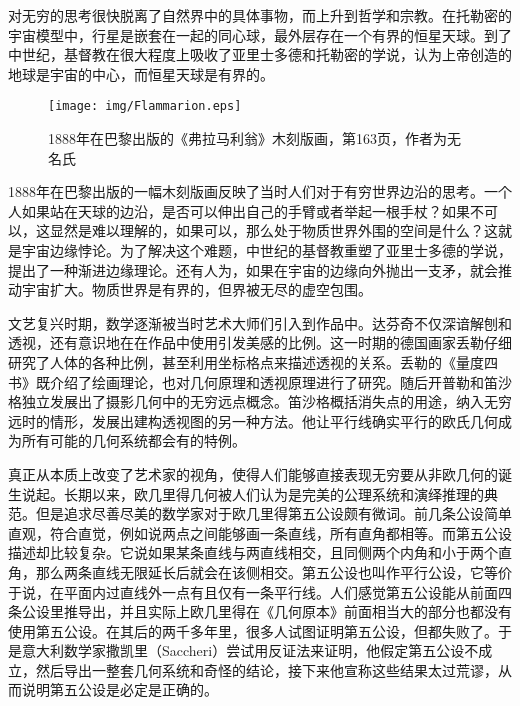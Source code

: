 \documentclass{article}
\begin{document}
对无穷的思考很快脱离了自然界中的具体事物，而上升到哲学和宗教。在托勒密的宇宙模型中，行星是嵌套在一起的同心球，最外层存在一个有界的恒星天球。到了中世纪，基督教在很大程度上吸收了亚里士多德和托勒密的学说，认为上帝创造的地球是宇宙的中心，而恒星天球是有界的。

\begin{figure}[htbp]
 \centering
 \texttt{[image: img/Flammarion.eps]}
 \captionsetup{labelformat=empty}
 \caption{1888年在巴黎出版的《弗拉马利翁》木刻版画，第163页，作者为无名氏}
 \label{fig:Flamarion-woodcut}
\end{figure}




1888年在巴黎出版的一幅木刻版画反映了当时人们对于有穷世界边沿的思考。一个人如果站在天球的边沿，是否可以伸出自己的手臂或者举起一根手杖？如果不可以，这显然是难以理解的，如果可以，那么处于物质世界外围的空间是什么？这就是宇宙边缘悖论。为了解决这个难题，中世纪的基督教重塑了亚里士多德的学说，提出了一种渐进边缘理论。还有人为，如果在宇宙的边缘向外抛出一支矛，就会推动宇宙扩大。物质世界是有界的，但界被无尽的虚空包围。

文艺复兴时期，数学逐渐被当时艺术大师们引入到作品中。达芬奇不仅深谙解刨和透视，还有意识地在在作品中使用引发美感的比例。这一时期的德国画家丢勒仔细研究了人体的各种比例，甚至利用坐标格点来描述透视的关系。丢勒的《量度四书》既介绍了绘画理论，也对几何原理和透视原理进行了研究。随后开普勒和笛沙格独立发展出了摄影几何中的无穷远点概念。笛沙格概括消失点的用途，纳入无穷远时的情形，发展出建构透视图的另一种方法。他让平行线确实平行的欧氏几何成为所有可能的几何系统都会有的特例。

真正从本质上改变了艺术家的视角，使得人们能够直接表现无穷要从非欧几何的诞生说起。长期以来，欧几里得几何被人们认为是完美的公理系统和演绎推理的典范。但是追求尽善尽美的数学家对于欧几里得第五公设颇有微词。前几条公设简单直观，符合直觉，例如说两点之间能够画一条直线，所有直角都相等。而第五公设描述却比较复杂。它说如果某条直线与两直线相交，且同侧两个内角和小于两个直角，那么两条直线无限延长后就会在该侧相交。第五公设也叫作平行公设，它等价于说，在平面内过直线外一点有且仅有一条平行线。人们感觉第五公设能从前面四条公设里推导出，并且实际上欧几里得在《几何原本》前面相当大的部分也都没有使用第五公设。在其后的两千多年里，很多人试图证明第五公设，但都失败了。于是意大利数学家撒凯里（Saccheri）尝试用反证法来证明，他假定第五公设不成立，然后导出一整套几何系统和奇怪的结论，接下来他宣称这些结果太过荒谬，从而说明第五公设是必定是正确的。
\end{document}
